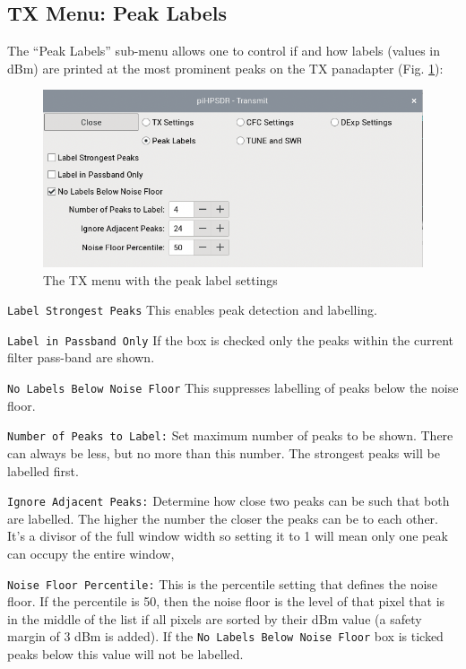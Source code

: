\documentclass[12pt]{book}
\def\rett#1{\texttt{\color{red}#1}}
\begin{document}
\subsection{TX Menu: Peak Labels}

The ``Peak Labels'' sub-menu allows one to control if and how labels
(values in dBm) are printed at the most prominent peaks on the
TX panadapter (Fig. \ref{fig:TXPeakMenu}):

\begin{figure}[ht]
\center
\includegraphics[scale=0.45]{TX_PEAK.png}
\caption{The TX menu with the peak label settings}
\label{fig:TXPeakMenu}
\end{figure}

\rett{Label Strongest Peaks} This enables peak detection and labelling.

\rett{Label in Passband Only} If the box is checked only the peaks within the
current filter pass-band  are shown.

\rett{No Labels Below Noise Floor} This suppresses labelling of peaks below the noise floor.

\rett{Number of Peaks to Label:} Set maximum number of peaks to be shown. There can always be less,
but no more than this number. The strongest peaks will be labelled first.

\rett{Ignore Adjacent Peaks:} Determine how close two peaks can be such that both are labelled.
The higher the number the closer the peaks can be to each other. It's a divisor of the
full window width so setting it to 1 will mean only one peak can occupy the entire window,

\rett{Noise Floor Percentile:} This is the percentile setting that defines the noise floor. If the
percentile is 50, then the noise floor is the level of that pixel that is in the middle of the list
if all pixels are sorted by their dBm value (a safety margin of 3 dBm is added).
If the \rett{No Labels Below Noise Floor} box is ticked
peaks below this value will not be labelled.
\end{document}
